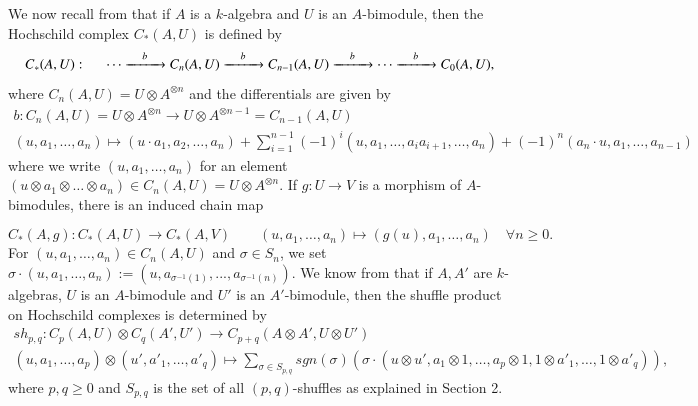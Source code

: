 \documentclass[10pt, colorlinks]{article}
\numberwithin{equation}{section} \DeclareMathSizes{2}{10}{12}{13}
\begin{document}
     
     We now recall from \cite[\S 1.1.1]{LD} that if $A$ is a $k$-algebra and $U$ is an $A$-bimodule, then the Hochschild complex $C_*(A,U)$ is defined by 
     \begin{equation*}
          C_*(A,U):\hspace{.5cm}\cdots\xrightarrow[]{\quad b\quad}C_n(A,U)\xrightarrow[]{\quad b\quad}C_{n-1}(A,U)\xrightarrow[]{\quad b\quad}\cdots \xrightarrow[]{\quad b\quad}C_0(A,U),
     \end{equation*}
     where $C_n(A,U)=U\otimes A^{\otimes n}$ and the differentials are given by 
     \begin{equation}\label{fdp1}
     \begin{array}{c}
           b:C_n(A,U)=U\otimes A^{\otimes n}\longrightarrow U\otimes A^{\otimes {n-1}}=C_{n-1}(A,U)\\
            (u,a_1,\ldots,a_n)\longmapsto (u\cdot a_1,a_2,\ldots,a_n)+\sum_{i=1}^{n-1}(-1)^i(u,a_1,\ldots,a_ia_{i+1},\ldots,a_n)+(-1)^n(a_n\cdot u,a_1,\ldots,a_{n-1})
     \end{array}
     \end{equation}
     where we write $ (u,a_1,\ldots,a_n)$ for an element $(u\otimes a_1\otimes \ldots\otimes a_n)\in C_n(A,U)=U\otimes A^{\otimes n}$. If $g:U\longrightarrow V$ is a morphism of $A$-bimodules, there is an induced chain map
     
     \begin{equation}\label{eq6.3}
    C_*(A,g):C_*(A,U)\longrightarrow C_*(A,V)\qquad (u,a_1,\ldots, a_n)\longmapsto (g(u),a_1,\ldots, a_n)\quad \forall n\geq 0.
     \end{equation}
   For $ (u,a_1,\ldots,a_n)\in C_n(A,U)$ and $\sigma\in S_n$, we set $\sigma\cdot  (u,a_1,\ldots,a_n):=(u,a_{\sigma^{-1}(1)},...,a_{\sigma^{-1}(n)})$. We know from \cite[\S 4.2.1]{LD} that if $A,A'$ are $k$-algebras, $U$ is an $A$-bimodule and $U'$ is an $A'$-bimodule, then the shuffle product on Hochschild complexes is determined by
     \begin{equation}\label{eq6.4}
     \begin{array}{c}
          sh_{p,q}: C_p(A,U)\otimes C_q(A',U')\longrightarrow C_{p+q}(A\otimes A',U\otimes U')  \\
          (u,a_1,\ldots,a_p)\otimes(u',a'_1,\ldots,a'_q)\longmapsto \underset{\sigma\in S_{p,q}}{\sum} sgn(\sigma)\left(\sigma\cdot(u\otimes u',a_1\otimes1,\ldots,a_p\otimes1,1\otimes a'_1,\ldots,1\otimes a'_q)\right),
     \end{array}   
     \end{equation}
    where $p,q\geq 0$ and $S_{p,q}$ is the set of all $(p,q)$-shuffles as explained in Section 2. 
    
\end{document}
